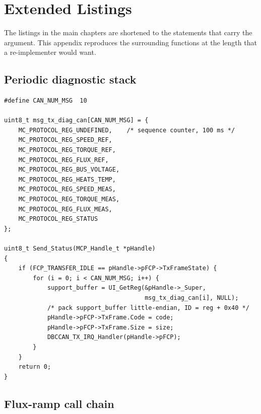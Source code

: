 \chapter{Extended Listings}
\label{ch:app}

The listings in the main chapters are shortened to the statements that
carry the argument. This appendix reproduces the surrounding functions
at the length that a re-implementer would want.

\section{Periodic diagnostic stack}

\begin{lstlisting}[style=cstyle,caption={Diagnostic register list and Send\_Status sketch.}]
#define CAN_NUM_MSG  10

uint8_t msg_tx_diag_can[CAN_NUM_MSG] = {
    MC_PROTOCOL_REG_UNDEFINED,    /* sequence counter, 100 ms */
    MC_PROTOCOL_REG_SPEED_REF,
    MC_PROTOCOL_REG_TORQUE_REF,
    MC_PROTOCOL_REG_FLUX_REF,
    MC_PROTOCOL_REG_BUS_VOLTAGE,
    MC_PROTOCOL_REG_HEATS_TEMP,
    MC_PROTOCOL_REG_SPEED_MEAS,
    MC_PROTOCOL_REG_TORQUE_MEAS,
    MC_PROTOCOL_REG_FLUX_MEAS,
    MC_PROTOCOL_REG_STATUS
};

uint8_t Send_Status(MCP_Handle_t *pHandle)
{
    if (FCP_TRANSFER_IDLE == pHandle->pFCP->TxFrameState) {
        for (i = 0; i < CAN_NUM_MSG; i++) {
            support_buffer = UI_GetReg(&pHandle->_Super,
                                       msg_tx_diag_can[i], NULL);
            /* pack support_buffer little-endian, ID = reg + 0x40 */
            pHandle->pFCP->TxFrame.Code = code;
            pHandle->pFCP->TxFrame.Size = size;
            DBCCAN_TX_IRQ_Handler(pHandle->pFCP);
        }
    }
    return 0;
}
\end{lstlisting}

\section{Flux-ramp call chain}

